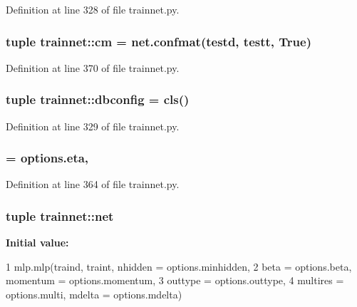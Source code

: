 Definition at line 328 of file trainnet.py.

\hypertarget{namespacetrainnet_afdfd7e6bbac45ccf3826d60cf8636299}{
\subsubsection[{cm}]{\setlength{\rightskip}{0pt plus 5cm}tuple {\bf trainnet::cm} = net.confmat(testd, testt, True)}}
\label{namespacetrainnet_afdfd7e6bbac45ccf3826d60cf8636299}


Definition at line 370 of file trainnet.py.

\hypertarget{namespacetrainnet_a293be6aa425ca070702d0f999f1ea68d}{
\subsubsection[{dbconfig}]{\setlength{\rightskip}{0pt plus 5cm}tuple {\bf trainnet::dbconfig} = {\bf cls}()}}
\label{namespacetrainnet_a293be6aa425ca070702d0f999f1ea68d}


Definition at line 329 of file trainnet.py.

\hypertarget{namespacetrainnet_a6eceefa845bebe7f22951cbc18af394b}{
\subsubsection[{eta}]{ = options.eta,}}
\label{namespacetrainnet_a6eceefa845bebe7f22951cbc18af394b}


Definition at line 364 of file trainnet.py.

\hypertarget{namespacetrainnet_afce55f5d26936ba4b8622fc19ba56446}{
\subsubsection[{net}]{\setlength{\rightskip}{0pt plus 5cm}tuple {\bf trainnet::net}}}
\label{namespacetrainnet_afce55f5d26936ba4b8622fc19ba56446}
{\bfseries Initial value:}
\begin{DoxyCode}
1 mlp.mlp(traind, traint, nhidden = options.minhidden, 
2                   beta = options.beta, momentum = options.momentum, 
3                   outtype = options.outtype, 
4                   multires = options.multi, mdelta = options.mdelta)
\end{DoxyCode}


